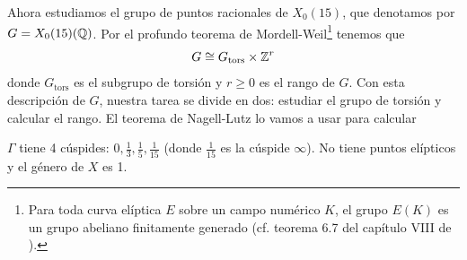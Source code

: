 \documentclass[../../tesis_maestria]{subfiles}
\begin{document}
Ahora estudiamos el grupo de puntos racionales de $X_0(15)$, que denotamos por $G=X_0(15)(\mathbb{Q})$. Por el profundo teorema de Mordell-Weil\footnote{Para toda curva elíptica $E$ sobre un campo numérico $K$, el grupo $E(K)$ es un grupo abeliano finitamente generado (cf. teorema 6.7 del capítulo VIII de \cite{SilvermanTAOEC}).} tenemos que
\[
	G\cong G_{\mathrm{tors}}\times\mathbb{Z}^r
\]
donde $G_{\mathrm{tors}}$ es el subgrupo de torsión y $r\geq0$ es el rango de $G$. Con esta descripción de $G$, nuestra tarea se divide en dos: estudiar el grupo de torsión y calcular el rango. El teorema de Nagell-Lutz lo vamos a usar para calcular 

\begin{prop}
  $\Gamma$ tiene 4 c\'uspides: $0,\tfrac{1}{3},\tfrac{1}{5},\tfrac{1}{15}$ (donde $\tfrac{1}{15}$
  es la c\'uspide $\infty$). No tiene puntos el\'ipticos y el g\'enero de $X$ es 1.
\end{prop}
\end{document}
